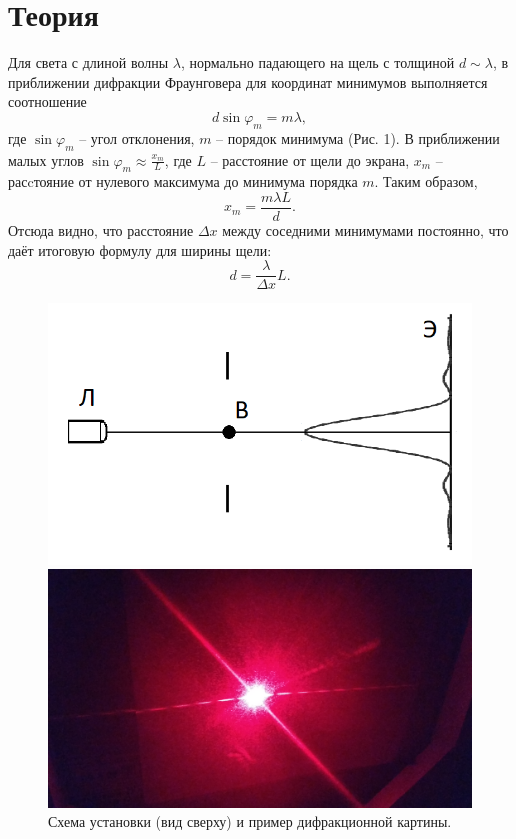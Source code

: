 \documentclass[a4paper,12pt]{article}
\begin{document}
\section*{Теория}
Для света с длиной волны $\lambda$, нормально падающего на щель с толщиной $d \sim \lambda$, в приближении дифракции Фраунговера для координат минимумов выполняется соотношение
$$
d \sin \varphi_m = m\lambda,
$$
где $\sin \varphi_m$ -- угол отклонения, $m$ -- порядок минимума (Рис. 1). В приближении малых углов $\sin \varphi_m \approx \frac{x_m}{L}$, где $L$ -- расстояние от щели до экрана, $x_m$ -- расcтояние от нулевого максимума до минимума порядка $m$. Таким образом,
$$
x_m = \dfrac{m\lambda L}{d}.
$$
Отсюда видно, что расстояние $\Delta x$ между соседними минимумами постоянно, что даёт итоговую формулу для ширины щели:
\[
d = \dfrac{\lambda}{\Delta x}L. \tag{$\star$}
\]
\begin{figure}[h]
\begin{minipage}[h]{0.45\linewidth}
\includegraphics[scale=0.5]{2.png}
\centering
\end{minipage}
\hfill
\begin{minipage}[h]{0.45\linewidth}
\includegraphics[scale=0.05]{4.jpg}
\centering
\end{minipage}
\centering
\caption{Схема установки (вид сверху) и пример дифракционной картины.}
\end{figure}\\
\end{document}
